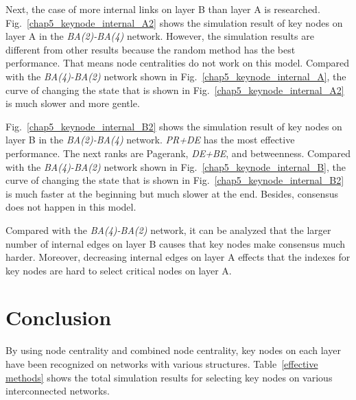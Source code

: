 Next, the case of more internal links on layer B than layer A is researched. Fig.~\ref{chap5_keynode_internal_A2} shows the simulation result of key nodes on layer A in the \textit{BA(2)-BA(4)} network. However, the simulation results are different from other results because the random method has the best performance. That means node centralities do not work on this model. Compared with the \textit{BA(4)-BA(2)} network shown in Fig.~\ref{chap5_keynode_internal_A}, the curve of changing the state that is shown in Fig.~\ref{chap5_keynode_internal_A2}  is much slower and more gentle.

Fig.~\ref{chap5_keynode_internal_B2} shows the simulation result of key nodes on layer B in the \textit{BA(2)-BA(4)} network. \textit{PR+DE} has the most effective performance. The next ranks are Pagerank, \textit{DE+BE}, and betweenness. Compared with the \textit{BA(4)-BA(2)} network shown in Fig.~\ref{chap5_keynode_internal_B}, the curve of changing the state that is shown in Fig.~\ref{chap5_keynode_internal_B2} is much faster at the beginning but much slower at the end. Besides, consensus does not happen in this model.

Compared with the \textit{BA(4)-BA(2)} network, it can be analyzed that the larger number of internal edges on layer B causes that key nodes make consensus much harder. Moreover, decreasing internal edges on layer A effects that the indexes for key nodes are hard to select critical nodes on layer A.\\   

\section{Conclusion}
By using node centrality and combined node centrality, key nodes on each layer have been recognized on networks with various structures. Table~\ref{effective methods} shows the total simulation results for selecting key nodes on various interconnected networks.
 
